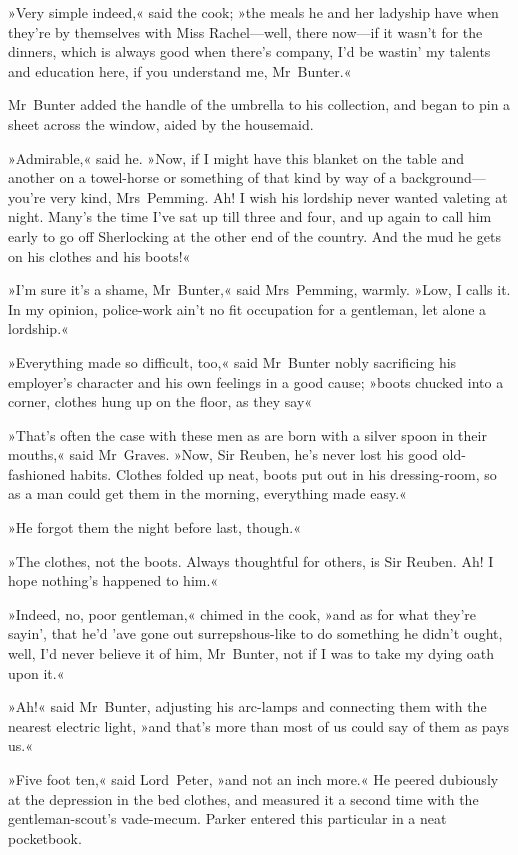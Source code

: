 »Very simple indeed,« said the cook; »the meals he and her ladyship have when they're by themselves with Miss Rachel—well, there now—if it wasn't for the dinners, which is always good when there's company, I'd be wastin' my talents and education here, if you understand me, Mr~Bunter.«

Mr~Bunter added the handle of the umbrella to his collection, and began to pin a sheet across the window, aided by the housemaid.

»Admirable,« said he. »Now, if I might have this blanket on the table and another on a towel-horse or something of that kind by way of a background—you're very kind, Mrs~Pemming\textellipsis . Ah! I wish his lordship never wanted valeting at night. Many's the time I've sat up till three and four, and up again to call him early to go off Sherlocking at the other end of the country. And the mud he gets on his clothes and his boots!«

»I'm sure it's a shame, Mr~Bunter,« said Mrs~Pemming, warmly. »Low, I calls it. In my opinion, police-work ain't no fit occupation for a gentleman, let alone a lordship.«

»Everything made so difficult, too,« said Mr~Bunter nobly sacrificing his employer's character and his own feelings in a good cause; »boots chucked into a corner, clothes hung up on the floor, as they say\longdash«

»That's often the case with these men as are born with a silver spoon in their mouths,« said Mr~Graves. »Now, Sir Reuben, he's never lost his good old-fashioned habits. Clothes folded up neat, boots put out in his dressing-room, so as a man could get them in the morning, everything made easy.«

»He forgot them the night before last, though.«

»The clothes, not the boots. Always thoughtful for others, is Sir Reuben. Ah! I hope nothing's happened to him.«

»Indeed, no, poor gentleman,« chimed in the cook, »and as for what they're sayin', that he'd 'ave gone out surrepshous-like to do something he didn't ought, well, I'd never believe it of him, Mr~Bunter, not if I was to take my dying oath upon it.«

»Ah!« said Mr~Bunter, adjusting his arc-lamps and connecting them with the nearest electric light, »and that's more than most of us could say of them as pays us.«

»Five foot ten,« said Lord~Peter, »and not an inch more.« He peered dubiously at the depression in the bed clothes, and measured it a second time with the gentleman-scout's vade-mecum. Parker entered this particular in a neat pocketbook.

